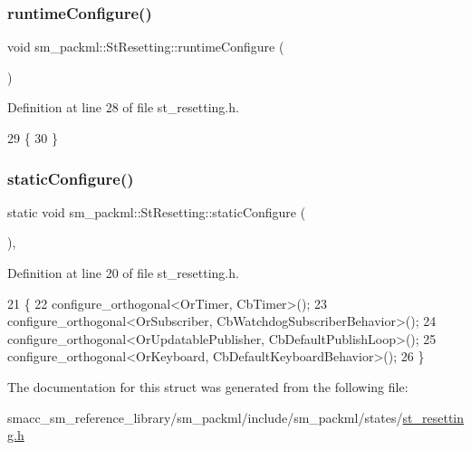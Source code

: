 \subsubsection{\texorpdfstring{runtime\+Configure()}{runtimeConfigure()}}
{\footnotesize\ttfamily void sm\+\_\+packml\+::\+St\+Resetting\+::runtime\+Configure (\begin{DoxyParamCaption}{ }\end{DoxyParamCaption})\hspace{0.3cm}{\ttfamily [inline]}}



Definition at line 28 of file st\+\_\+resetting.\+h.


\begin{DoxyCode}
29     \{
30     \}
\end{DoxyCode}
\mbox{\label{structsm__packml_1_1StResetting_a03caab1a0b676ac2113e5e42fd235de3}} 
\subsubsection{\texorpdfstring{static\+Configure()}{staticConfigure()}}
{\footnotesize\ttfamily static void sm\+\_\+packml\+::\+St\+Resetting\+::static\+Configure (\begin{DoxyParamCaption}{ }\end{DoxyParamCaption})\hspace{0.3cm}{\ttfamily [inline]}, {\ttfamily [static]}}



Definition at line 20 of file st\+\_\+resetting.\+h.


\begin{DoxyCode}
21     \{
22         configure\_orthogonal<OrTimer, CbTimer>();   
23         configure\_orthogonal<OrSubscriber, CbWatchdogSubscriberBehavior>();
24         configure\_orthogonal<OrUpdatablePublisher, CbDefaultPublishLoop>();
25         configure\_orthogonal<OrKeyboard, CbDefaultKeyboardBehavior>();
26     \}
\end{DoxyCode}


The documentation for this struct was generated from the following file\+:\begin{DoxyCompactItemize}
\item 
smacc\+\_\+sm\+\_\+reference\+\_\+library/sm\+\_\+packml/include/sm\+\_\+packml/states/\hyperlink{st__resetting_8h}{st\+\_\+resetting.\+h}\end{DoxyCompactItemize}
